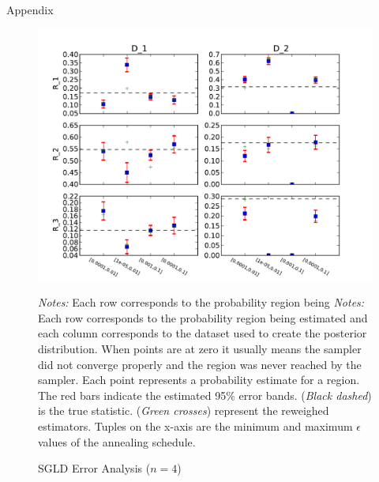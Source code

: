 \documentclass{article}
\begin{document}
\begin{section}{Appendix}
\begin{figure}
\caption{SGLD Error Analysis ($n=4$)}
\label{n4}
\begin{center}
\includegraphics[scale=0.7]{../figures/errors_n4.pdf}
\end{center}
{\scriptsize {\em Notes:} Each row corresponds to the probability region being {\em Notes:} Each row corresponds to the probability region being estimated and each column corresponds to the dataset used to create the posterior distribution. When points are at zero it usually means the sampler did not converge properly and the region was never reached by the sampler.  Each point represents a probability estimate for a region. The red bars indicate the estimated 95\% error bands.  ({\em Black dashed}) is the true statistic.  ({\em Green crosses}) represent the reweighed estimators. Tuples on the x-axis are the minimum and maximum $\epsilon$ values of the annealing schedule. }
\end{figure}


\end{section}
\end{document}
